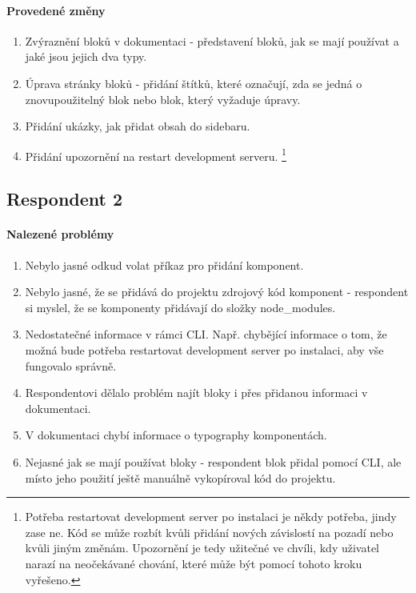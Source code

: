 \paragraph{Provedené změny}
\begin{enumerate}
  \item Zvýraznění bloků v dokumentaci - představení bloků, jak se mají používat a jaké jsou jejich dva typy.
  \item Úprava stránky bloků - přidání štítků, které označují, zda se jedná o znovupoužitelný blok nebo blok, který vyžaduje úpravy.
  \item Přidání ukázky, jak přidat obsah do sidebaru.
  \item Přidání upozornění na restart development serveru. \footnote{Potřeba restartovat development server po instalaci je někdy potřeba, jindy zase ne. Kód se může rozbít kvůli přidání nových závislostí na pozadí nebo kvůli jiným změnám. Upozornění je tedy užitečné ve chvíli, kdy uživatel narazí na neočekávané chování, které může být pomocí tohoto kroku vyřešeno.}
\end{enumerate}


\subsection{Respondent 2}

\paragraph{Nalezené problémy}
\begin{enumerate}
  \item Nebylo jasné odkud volat příkaz pro přidání komponent.
  \item Nebylo jasné, že se přidává do projektu zdrojový kód komponent - respondent si myslel, že se komponenty přidávají do složky node\_modules.
  \item Nedostatečné informace v rámci CLI. Např. chybějící informace o tom, že možná bude potřeba restartovat development server po instalaci, aby vše fungovalo správně.
  \item Respondentovi dělalo problém najít bloky i přes přidanou informaci v dokumentaci.
  \item V dokumentaci chybí informace o typography komponentách.
  \item Nejasné jak se mají používat bloky - respondent blok přidal pomocí CLI, ale místo jeho použití ještě manuálně vykopíroval kód do projektu.
\end{enumerate}

